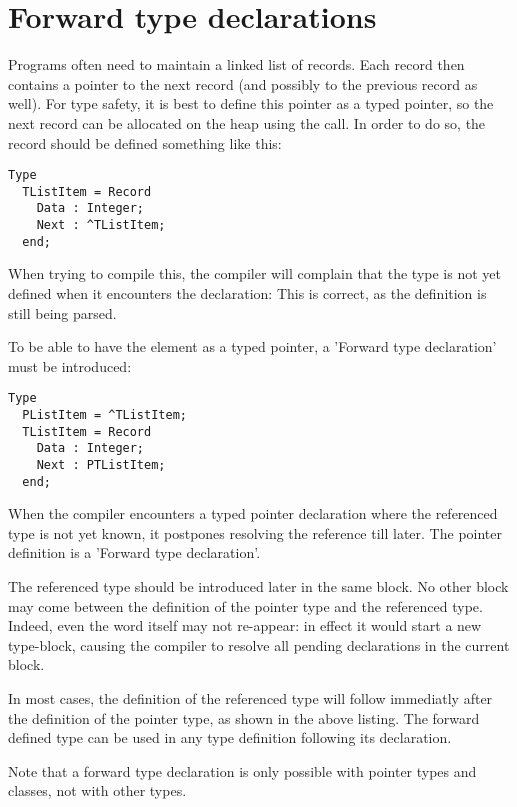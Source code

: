 \section{Forward type declarations}
Programs often need to maintain a linked list of records. Each record then
contains a pointer to the next record (and possibly to the previous record
as well). For type safety, it is best to define this pointer as a typed
pointer, so the next record can be allocated on the heap using the 
call. In order to do so, the record should be defined something like this:
\begin{verbatim}
Type
  TListItem = Record
    Data : Integer;
    Next : ^TListItem;
  end;
\end{verbatim}  
When trying to compile this, the compiler will complain that the
 type is not yet defined when it encounters the 
declaration: This is correct, as the definition is still being parsed.

To be able to have the  element as a typed pointer, a 'Forward
type declaration' must be introduced:
\begin{verbatim}
Type
  PListItem = ^TListItem;
  TListItem = Record
    Data : Integer;
    Next : PTListItem;
  end;
\end{verbatim}  
When the compiler encounters a typed pointer declaration where the
referenced type is not yet known, it postpones resolving the reference till
later. The pointer definition is a 'Forward type declaration'. 

The referenced type should be introduced later in the same  block. 
No other block may come between the definition of the pointer type and the referenced type.
Indeed, even the word  itself may not re-appear: in effect it
would start a new type-block, causing the compiler to resolve all pending
declarations in the current block. 

In most cases, the definition of the referenced type will follow immediatly 
after the definition of the pointer type, as shown in the above listing. 
The forward defined type can be used in any type definition following its 
declaration.

Note that a forward type declaration is only possible with pointer types and
classes, not with other types.

